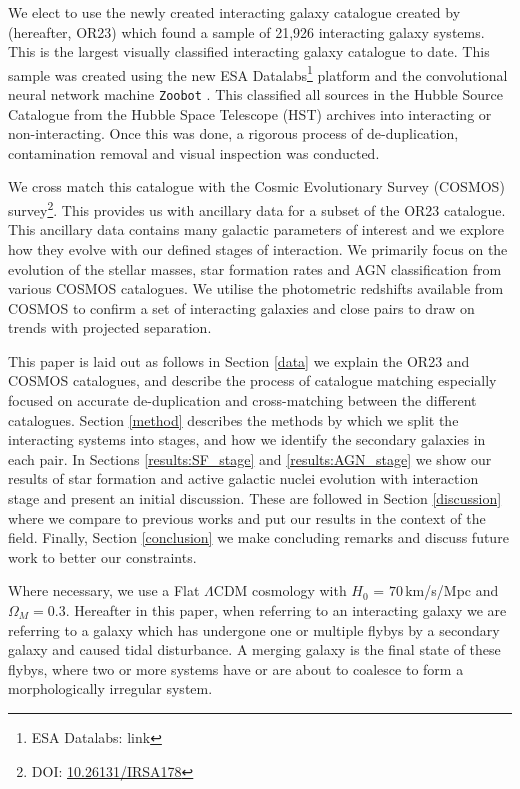 We elect to use the newly created interacting galaxy catalogue created by \citet{2023ApJ...948...40O} (hereafter, OR23) which found a sample of 21,926 interacting galaxy systems. This is the largest visually classified interacting galaxy catalogue to date. This sample was created using the new ESA Datalabs\footnote{ESA Datalabs: link} platform and the convolutional neural network machine \texttt{Zoobot} \citep{2022MNRAS.509.3966W, 2023JOSS....8.5312W}. This classified all sources in the Hubble Source Catalogue \citep{2016AJ....151..134W} from the Hubble Space Telescope (HST) archives into interacting or non-interacting. Once this was done, a rigorous process of de-duplication, contamination removal and visual inspection was conducted.

We cross match this catalogue with the Cosmic Evolutionary Survey (COSMOS) survey\footnote{DOI: \href{https://www.ipac.caltech.edu/doi/irsa/10.26131/IRSA178}{10.26131/IRSA178}}. This provides us with ancillary data for a subset of the OR23 catalogue. This ancillary data contains many galactic parameters of interest and we explore how they evolve with our defined stages of interaction. We primarily focus on the evolution of the stellar masses, star formation rates and AGN classification from various COSMOS catalogues. We utilise the photometric redshifts available from COSMOS to confirm a set of interacting galaxies and close pairs to draw on trends with projected separation.

This paper is laid out as follows in Section \ref{data} we explain the OR23 and COSMOS catalogues, and describe the process of catalogue matching especially focused on accurate de-duplication and cross-matching between the different catalogues.  Section \ref{method} describes the methods by which we split the interacting systems into stages, and how we identify the secondary galaxies in each pair. In Sections \ref{results:SF_stage} and \ref{results:AGN_stage} we show our results of star formation and active galactic nuclei evolution with interaction stage and present an initial discussion. These are followed in Section \ref{discussion} where we compare to previous works and put our results in the context of the field. Finally, Section \ref{conclusion} we make concluding remarks and discuss future work to better our constraints. 

Where necessary, we use a Flat $\Lambda$CDM cosmology with $H_0$ = $70$\,km/s/Mpc and $\Omega_M = 0.3$. Hereafter in this paper, when referring to an interacting galaxy we are referring to a galaxy which has undergone one or multiple flybys by a secondary galaxy and caused tidal disturbance. A merging galaxy is the final state of these flybys, where two or more systems have or are about to coalesce to form a morphologically irregular system.

